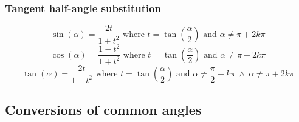 \subsubsection{Tangent half-angle substitution}
\[
\sin(\alpha) = \frac{2t}{1+t^2} \text{ where } t=\tan\left(\frac{\alpha}{2}\right) \text{ and } \alpha \ne \pi + 2k\pi
\]
\[
\cos(\alpha) = \frac{1-t^2}{1+t^2} \text{ where } t=\tan\left(\frac{\alpha}{2}\right) \text{ and } \alpha \ne \pi + 2k\pi
\]
\[
\tan(\alpha) = \frac{2t}{1-t^2} \text{ where } t=\tan\left(\frac{\alpha}{2}\right) \text{ and } \alpha \ne \frac{\pi}{2} + k\pi \ \wedge \ \alpha \ne \pi + 2k\pi
\]

\subsection{Conversions of common angles}
